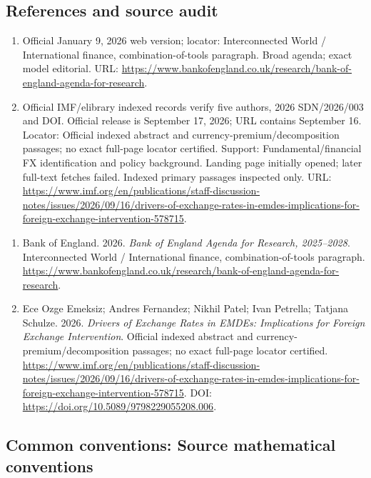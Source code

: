 \documentclass[11pt,a4paper]{article}
\begin{document}
\subsection*{References and source audit}
\begin{enumerate}
\item Official January 9, 2026 web version; locator: Interconnected World / International finance, combination-of-tools paragraph. Broad agenda; exact model editorial. URL: \url{https://www.bankofengland.co.uk/research/bank-of-england-agenda-for-research}.
\item Official IMF/elibrary indexed records verify five authors, 2026 SDN/2026/003 and DOI. Official release is September 17, 2026; URL contains September 16. Locator: Official indexed abstract and currency-premium/decomposition passages; no exact full-page locator certified. Support: Fundamental/financial FX identification and policy background. Landing page initially opened; later full-text fetches failed. Indexed primary passages inspected only. URL: \url{https://www.imf.org/en/publications/staff-discussion-notes/issues/2026/09/16/drivers-of-exchange-rates-in-emdes-implications-for-foreign-exchange-intervention-578715}.
\end{enumerate}
\begin{enumerate}\raggedright
\item\hypertarget{definitions:source:30007619:1}{} Bank of England. 2026. \emph{Bank of England Agenda for Research, 2025–2028}. Interconnected World / International finance, combination-of-tools paragraph.
\url{https://www.bankofengland.co.uk/research/bank-of-england-agenda-for-research}.
\item\hypertarget{definitions:source:30007619:2}{} Ece Ozge Emeksiz; Andres Fernandez; Nikhil Patel; Ivan Petrella; Tatjana Schulze. 2026. \emph{Drivers of Exchange Rates in EMDEs: Implications for Foreign Exchange Intervention}. Official indexed abstract and currency-premium/decomposition passages; no exact full-page locator certified.
\url{https://www.imf.org/en/publications/staff-discussion-notes/issues/2026/09/16/drivers-of-exchange-rates-in-emdes-implications-for-foreign-exchange-intervention-578715}.
DOI: \url{https://doi.org/10.5089/9798229055208.006}.
\end{enumerate}

\subsection*{Common conventions: Source mathematical conventions}
\end{document}
